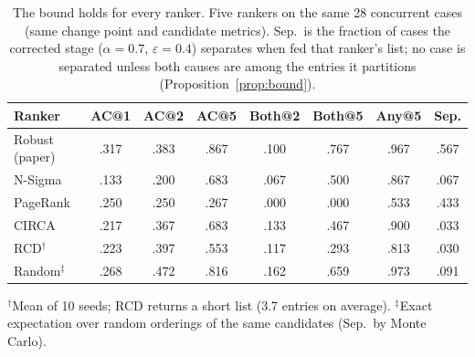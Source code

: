 \begin{table}[t]
\centering\footnotesize
\setlength{\tabcolsep}{3.2pt}
\caption{The bound holds for every ranker. Five rankers on the same 28 concurrent cases (same change point and candidate metrics). Sep.\ is the fraction of cases the corrected stage ($\alpha{=}0.7$, $\varepsilon{=}0.4$) separates when fed that ranker's list; no case is separated unless both causes are among the entries it partitions (Proposition~\ref{prop:bound}).}
\label{tab:rankers}
\begin{tabular}{@{}lccccccc@{}}
\toprule
\textbf{Ranker} & \textbf{AC@1} & \textbf{AC@2} & \textbf{AC@5} & \textbf{Both@2} & \textbf{Both@5} & \textbf{Any@5} & \textbf{Sep.}\\
\midrule
Robust (paper) & .317 & .383 & .867 & .100 & .767 & .967 & .567 \\
N-Sigma & .133 & .200 & .683 & .067 & .500 & .867 & .067 \\
PageRank & .250 & .250 & .267 & .000 & .000 & .533 & .433 \\
CIRCA & .217 & .367 & .683 & .133 & .467 & .900 & .033 \\
RCD$^{\dagger}$ & .223 & .397 & .553 & .117 & .293 & .813 & .030 \\
\midrule
Random$^{\ddagger}$ & .268 & .472 & .816 & .162 & .659 & .973 & .091 \\
\bottomrule
\end{tabular}
\par\smallskip\raggedright\scriptsize $^{\dagger}$Mean of 10 seeds; RCD returns a short list (3.7 entries on average). $^{\ddagger}$Exact expectation over random orderings of the same candidates (Sep.\ by Monte Carlo).
\end{table}
